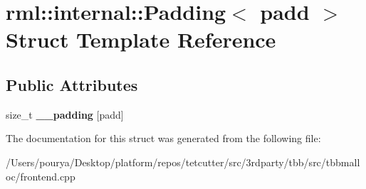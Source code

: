 \hypertarget{structrml_1_1internal_1_1Padding}{}\section{rml\+:\+:internal\+:\+:Padding$<$ padd $>$ Struct Template Reference}
\label{structrml_1_1internal_1_1Padding}
\subsection*{Public Attributes}
\begin{DoxyCompactItemize}
\item 
\hypertarget{structrml_1_1internal_1_1Padding_a7ca006bd5e030f220a2c8b8778d88a23}{}size\+\_\+t {\bfseries \+\_\+\+\_\+padding} \mbox{[}padd\mbox{]}\label{structrml_1_1internal_1_1Padding_a7ca006bd5e030f220a2c8b8778d88a23}

\end{DoxyCompactItemize}


The documentation for this struct was generated from the following file\+:\begin{DoxyCompactItemize}
\item 
/\+Users/pourya/\+Desktop/platform/repos/tetcutter/src/3rdparty/tbb/src/tbbmalloc/frontend.\+cpp\end{DoxyCompactItemize}

